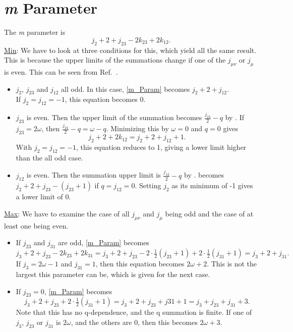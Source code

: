 \documentclass[Dissertation.tex]{subfiles}
\begin{document}
\section{\emph{m} Parameter}
The \emph{m} parameter is
\begin{equation}
	\label{m_Param}
	j_2 + 2 + j_{23} - 2 k_{23} + 2 k_{12}.
\end{equation}
\underline{Min}: 
We have to look at three conditions for this, which yield all the same result.
This is because the upper limits of the summations change if one of the
$j_{\mu \nu}$ or $j_{\mu}$ is even. This can be seen from Ref.~\cite{Perkins1969}.
\begin{itemize}
	\item $j_2$, $j_{23}$ and $j_{12}$ all odd. In this case, \cref{m_Param} becomes $j_2 + 2 + j_{12}.$ \\ If $j_2 = j_{12} = -1$, this equation becomes 0.
	\item $j_{23}$ is even. Then the upper limit of the summation becomes $\frac{j_{23}}{2}-q$ by \cite{Perkins1969}. If $j_{23} = 2 \omega$, then $\frac{j_{23}}{2}-q = \omega - q$.  Minimizing this by $\omega = 0$ and $q = 0$ gives
\begin{equation}
	j_2 + 2 + 2 k_{12} = j_2 + 2 + j_{12} + 1.
\end{equation}
	With $j_2 = j_{12} = -1$, this equation reduces to 1, giving a lower limit higher than the all odd case.
	\item $j_{12}$ is even. Then the summation upper limit is $\frac{j_{12}}{2}-q$ by \cite{Perkins1969}.  becomes $j_2 + 2 + j_{23} - (j_{23}+1)$ if $q = j_{12} = 0$.  Setting $j_2$ as its minimum of -1 gives a lower limit of 0.
\end{itemize}
\underline{Max}: We have to examine the case of all $j_{\mu \nu}$ and
   $j_{\mu}$ being odd and the case of at least one being even.
\begin{itemize}
  \item If $j_{23}$ and $j_{31}$ are odd, \cref{m_Param} becomes
  \begin{equation}
    j_3 + 2 + j_{23} - 2 k_{23} + 2 k_{31} = j_3 + 2 + j_{23} - 2\cdot\tfrac{1}{2} (j_{23} + 1) + 2\cdot\tfrac{1}{2} (j_{31} + 1) = j_{3} + 2 + j_{31}.
  \end{equation}
If $j_3 = 2\omega - 1$ and $j_{31} = 1$, then this equation becomes $2\omega + 2$.  This is not the largest this parameter can be, which is given for the next case.
  \item If $j_{23} = 0$, \cref{m_Param} becomes
	\begin{equation}
	j_3 + 2 + j_{23} + 2\cdot\tfrac{1}{2}(j_{31}+1) = j_3 + 2 + j_{23} + j{31} + 1 = j_3 + j_{23} + j_{31} + 3.
	\end{equation}
  Note that this has no q-dependence, and the q summation is finite.  If one of $j_3$, $j_{23}$ or $j_{31}$ is $2\omega$, and the others are 0, then this becomes $2\omega + 3$.
\end{itemize}
\end{document}
